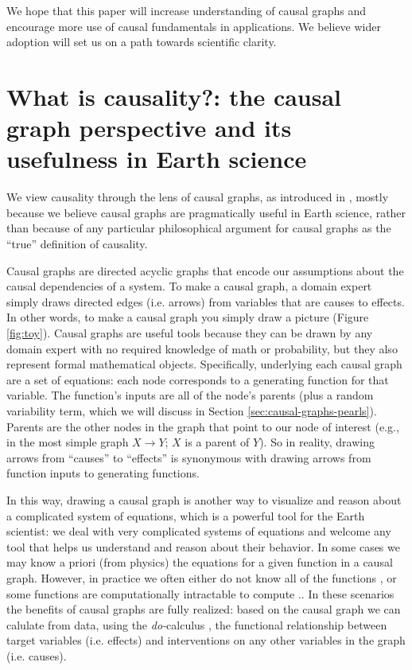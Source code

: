 \documentclass[12pt]{article}
\begin{document}
We hope that this paper will increase understanding of causal graphs
and encourage more use of causal fundamentals in applications. We
believe wider adoption will set us on a path towards scientific
clarity.

\section{What is causality?: the causal graph perspective and its
  usefulness in Earth science}\label{sec:what-caus-caus}

We view causality through the lens of causal graphs, as introduced in
\citet{pearl1995causal}, mostly because we believe causal graphs are
pragmatically useful in Earth science, rather than because of any
particular philosophical argument for causal graphs as the ``true''
definition of causality.

Causal graphs are directed acyclic graphs that encode our assumptions
about the causal dependencies of a system.  To make a causal graph, a
domain expert simply draws directed edges (i.e. arrows) from variables
that are causes to effects. In other words, to make a causal graph you
simply draw a picture (Figure \ref{fig:toy}). Causal graphs are useful
tools because they can be drawn by any domain expert with no required
knowledge of math or probability, but they also represent formal
mathematical objects. Specifically, underlying each causal graph are a
set of equations: each node corresponds to a generating function for
that variable. The function's inputs are all of the node's parents
(plus a random variability term, which we will discuss in Section
\ref{sec:causal-graphs-pearls}). Parents are the other nodes in the
graph that point to our node of interest (e.g., in the most simple
graph $X \to Y$; $X$ is a parent of $Y$). So in reality, drawing
arrows from ``causes'' to ``effects'' is synonymous with drawing
arrows from function inputs to generating functions.

In this way, drawing a causal graph is another way to visualize and
reason about a complicated system of equations, which is a powerful
tool for the Earth scientist: we deal with very complicated systems of
equations and welcome any tool that helps us understand and reason
about their behavior. In some cases we may know a priori (from
physics) the equations for a given function in a causal
graph. However, in practice we often either do not know all of the
functions \citep[e.g., plant stomata response to VPD]{massmann-2019},
or some functions are computationally intractable to compute
\citep[e.g., turbulence, moist convection, and cloud microphysics in
large scale models]{zadra2018}.. In these scenarios the benefits of
causal graphs are fully realized: based on the causal graph we can
calulate from data, using the \textit{do-}calculus
\citep{pearl-1994-do-calculus}, the functional relationship between
target variables (i.e. effects) and interventions on any other
variables in the graph (i.e. causes).
\end{document}
